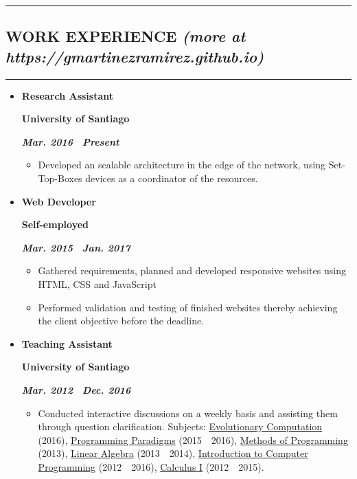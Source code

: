\documentclass[10pt,letterpaper]{article}
\newcommand{\textbox}[1]{
  \parbox{.333\textwidth}{#1}
}
\newcommand{\sectionTitle}[1]{
  \hrule
  \vspace{-1.0em} 
  \subsection*{\uppercase{\textbf{#1}} }
  \vspace{-0.3em}
    \hrule
    \vspace{0.3em}  
}
\newcommand{\sectionTitleWithWeb}[2]{
  \hrule
  \vspace{-1.0em} 
  \subsection*{\uppercase{\textbf{#1}} \hfill{\small \textit{(more at #2)}}}
  \vspace{-0.em}
  \hrule
  \vspace{0.3em}  
}
\newcommand{\titleExperienceWithoutLocation}[4]{
  \vspace{1.0em}
  \item[]
  {
    \textbox{\textbf{#1}\hfill}\textbox{\hfil \textbf{#2}\hfil}\hfill \textbf{\emph{#3 \textendash \ #4}}
  }
}
\begin{document}
  \sectionTitleWithWeb{Work Experience}{https://gmartinezramirez.github.io}
  \vspace{-1.1em}
  \begin{itemize}[noitemsep,topsep=0pt]
    \titleExperienceWithoutLocation{Research Assistant}{University of Santiago}{Mar. 2016}{Present}
      \begin{itemize}[label=\textbullet,noitemsep,topsep=0pt]
        \item Developed an scalable architecture in the edge of the network, using Set-Top-Boxes devices as a coordinator of the resources.
      \end{itemize}

    \vspace{-0.6em} 
    \titleExperienceWithoutLocation{Web Developer}{Self-employed}{Mar. 2015}{Jan. 2017}
      \begin{itemize}[label=\textbullet,noitemsep,topsep=0pt]
        \item Gathered requirements, planned and developed responsive websites using HTML, CSS and JavaScript 
        \item Performed validation and testing of finished websites thereby achieving the client objective before the deadline.
      \end{itemize}
    
    \vspace{-0.6em} 
    \titleExperienceWithoutLocation{Teaching Assistant}{University of Santiago}{Mar. 2012}{Dec. 2016}
      \begin{itemize}[label=\textbullet]
        \itemsep0em
        \item Conducted interactive discussions on a weekly basis and assisting them through question clarification. Subjects: \ul{Evolutionary Computation} (2016), \ul{Programming Paradigms} (2015\ \textendash \ 2016), \ul{Methods of Programming} (2013), \ul{Linear Algebra} (2013\ \textendash \ 2014), \ul{Introduction to Computer Programming} (2012\ \textendash \ 2016), \ul{Calculus I} (2012\ \textendash \ 2015).
      \end{itemize}
  \end{itemize}
  \vspace{0.30em} 
\end{document}
